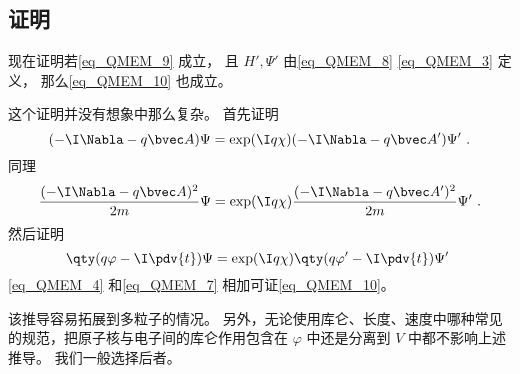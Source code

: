 \subsection{证明}\label{sub_QMEM_1}
现在证明若\autoref{eq_QMEM_9} 成立， 且 $H', \Psi'$ 由\autoref{eq_QMEM_8} \autoref{eq_QMEM_3} 定义， 那么\autoref{eq_QMEM_10} 也成立。

这个证明并没有想象中那么复杂。 首先证明
\begin{equation}
(-\I\Nabla - q\bvec A)\Psi = \exp(\I q\chi)(-\I\Nabla - q\bvec A')\Psi'~.
\end{equation}
同理
\begin{equation}\label{eq_QMEM_4}
\frac{(-\I\Nabla - q\bvec A)^2}{2m}\Psi = \exp(\I q\chi)\frac{(-\I\Nabla - q\bvec A')^2}{2m}\Psi'~.
\end{equation}
然后证明
\begin{equation}\label{eq_QMEM_7}
\qty(q\varphi - \I \pdv{t})\Psi= \exp(\I q\chi)\qty(q\varphi' - \I \pdv{t})\Psi'~
\end{equation}
\autoref{eq_QMEM_4} 和\autoref{eq_QMEM_7} 相加可证\autoref{eq_QMEM_10}。

该推导容易拓展到多粒子的情况。 另外，无论使用库仑、长度、速度中哪种常见的规范，把原子核与电子间的库仑作用包含在 $\varphi$ 中还是分离到 $V$ 中都不影响上述推导。 我们一般选择后者。
